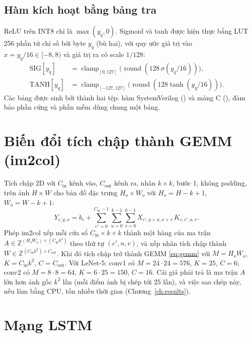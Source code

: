 \subsection{Hàm kích hoạt bằng bảng tra}
ReLU trên INT8 chỉ là $\max(y_q,0)$. Sigmoid và tanh được hiện thực bằng LUT 256 phần tử chỉ số bởi byte $y_q$ (bù hai), với quy ước giá trị vào $x=y_q/16\in[-8,8)$ và giá trị ra có scale $1/128$:
\begin{align}
  \mathrm{SIG}[y_q]&=\operatorname{clamp}_{[0,127]}\big(\operatorname{round}(128\,\sigma(y_q/16))\big),\\
  \mathrm{TANH}[y_q]&=\operatorname{clamp}_{[-127,127]}\big(\operatorname{round}(128\tanh(y_q/16))\big).
\end{align}
Các bảng được sinh bởi  thành hai tệp: hàm  SystemVerilog () và mảng C (), đảm bảo phần cứng và phần mềm dùng chung một bảng.

\section{Biến đổi tích chập thành GEMM (im2col)}
\label{sec:im2col}
Tích chập 2D với $C_\text{in}$ kênh vào, $C_\text{out}$ kênh ra, nhân $k\times k$, bước 1, không padding, trên ảnh $H\times W$ cho bản đồ đặc trưng $H_o\times W_o$ với $H_o=H-k+1$, $W_o=W-k+1$:
\begin{equation}
  Y_{c,y,x} = b_c + \sum_{c'=0}^{C_\text{in}-1}\sum_{u=0}^{k-1}\sum_{v=0}^{k-1} X_{c',y+u,x+v}\,K_{c,c',u,v}.
\end{equation}
Phép im2col \cite{chellapilla2006im2col} xếp mỗi cửa sổ $C_\text{in}\times k\times k$ thành một hàng của ma trận $A\in\mathbb{Z}^{(H_oW_o)\times(C_\text{in}k^2)}$ theo thứ tự $(c',u,v)$, và xếp nhân tích chập thành $W\in\mathbb{Z}^{(C_\text{in}k^2)\times C_\text{out}}$. Khi đó tích chập trở thành GEMM \eqref{eq:gemm} với $M=H_oW_o$, $K=C_\text{in}k^2$, $C=C_\text{out}$. Với LeNet-5: conv1 có $M=24\cdot24=576$, $K=25$, $C=6$; conv2 có $M=8\cdot8=64$, $K=6\cdot25=150$, $C=16$. Cái giá phải trả là ma trận $A$ lớn hơn ảnh gốc $k^2$ lần (mỗi điểm ảnh bị chép tới 25 lần), và việc sao chép này, nếu làm bằng CPU, tốn nhiều thời gian (Chương~\ref{ch:results}).

\section{Mạng LSTM}
\label{sec:lstm}
